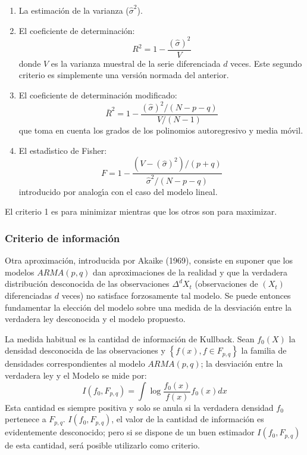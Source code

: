 \begin{enumerate}
\item La estimaci\'{o}n de la varianza ($\widehat{\sigma }^{2}$).
\item El coeficiente de determinaci\'{o}n:
\[
R^{2}=1-\frac{(\widehat{\sigma} )^{2}}{V}
\]
donde $V$ es la varianza muestral de la serie diferenciada $d$ veces. Este 
segundo criterio es simplemente una versi\'{o}n normada del anterior.

\item El coeficiente de determinaci\'{o}n modificado:
\[
\bar{R}^{2}=1-\frac{(\widehat{\sigma})^{2}/(N-p-q)}{V/(N-1)}
\]
que toma en cuenta los grados de los polinomios autoregresivo y media 
m\'{o}vil.

\item El estad\'{\i}stico de Fisher:
\[
F=1-\frac{(V-(\widehat{\sigma} )^{2})/(p+q)}{\widehat{\sigma} ^{2}/(N-p-q)}
\]
introducido por analog\'{\i}a con el caso del modelo lineal. 
\end{enumerate}

El criterio 1 es para minimizar mientras que los otros son para maximizar.



\subsubsection{Criterio de informaci\'{o}n}

Otra aproximaci\'{o}n, introducida por Akaike (1969), consiste en suponer 
que los modelos $ARMA  (p,q)$ dan aproximaciones de la realidad y 
que la verdadera distribuci\'{o}n desconocida de las observaciones 
${\Delta }^{d}X_{t}$ (observaciones de $\left( X_{t} \right)$ 
diferenciadas $d$ veces) no satisface forzosamente tal modelo. Se puede 
entonces fundamentar la elecci\'{o}n del modelo sobre una medida de la 
desviaci\'{o}n entre la verdadera ley desconocida y el modelo propuesto.

La medida habitual es la cantidad de informaci\'{o}n de Kullback. Sean 
$f_{0}(X)$ la densidad desconocida de las observaciones y $\left\{ f\left( x 
\right),f\in F_{p,q} \right\}$ la familia de densidades 
correspondientes al modelo $ARMA  (p,  q)$; la 
desviaci\'{o}n entre la verdadera ley y el Modelo se mide por:
\[
I\left( f_{0},F_{p,q} \right)=\int {\log\frac{f_{0}\left( x \right)}{f\left( 
x \right)}f_{0}\left( x \right)dx} 
\]
Esta cantidad es siempre positiva y solo se anula si la verdadera densidad 
$f_{0}$ pertenece a $F_{p,q}$. $I\left( f_{0},F_{p,q} \right)$, el valor de 
la cantidad de informaci\'{o}n es evidentemente desconocido; pero si se 
dispone de un buen estimador $I\left( f_{0},F_{p,q} \right)$ de esta 
cantidad, ser\'{a} posible utilizarlo como criterio.

